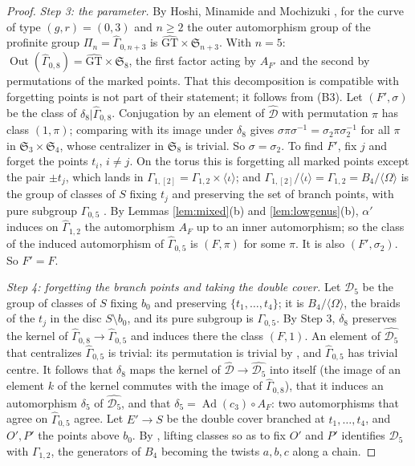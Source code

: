 \documentclass[11pt,a4paper]{article}
\theoremstyle{plain}
\theoremstyle{definition}
\theoremstyle{remark}
\newcommand{\GT}{\widehat{\mathrm{GT}}}
\newcommand{\Gh}{\widehat\Gamma}
\newcommand{\Ad}{\operatorname{Ad}}
\newcommand{\Out}{\operatorname{Out}}
\begin{document}
\begin{proof}
\emph{Step 3: the parameter.} By Hoshi, Minamide and Mochizuki
\cite[Corollary C; Corollary 2.8 in the body]{HMM}, for the curve of type $(g,r)=(0,3)$ and $n\ge2$ the outer
automorphism group of the profinite group $\Pi_n=\Gh_{0,n+3}$ is $\GT\times\mathfrak S_{n+3}$. With $n=5$:
$\Out(\Gh_{0,8})=\GT\times\mathfrak S_8$, the first factor acting by $A_{F'}$ and the second by permutations of the
marked points. That this decomposition is compatible with forgetting points is not part of their statement; it
follows from (B3). Let $(F',\sigma)$ be the class of
$\delta_8|\Gh_{0,8}$. Conjugation by an element of $\widehat{\mathcal D}$ with permutation $\pi$ has class $(1,\pi)$;
comparing with its image under $\delta_8$ gives $\sigma\pi\sigma^{-1}=\sigma_2\pi\sigma_2^{-1}$ for all $\pi$ in
$\mathfrak S_3\times\mathfrak S_4$, whose centralizer in $\mathfrak S_8$ is trivial. So $\sigma=\sigma_2$. To find
$F'$, fix $j$ and forget the points $t_i$, $i\ne j$. On the torus this is forgetting all marked points except the
pair $\pm t_j$, which lands in $\Gamma_{1,[2]}=\Gamma_{1,2}\times\langle\iota\rangle$; and
$\Gamma_{1,[2]}/\langle\iota\rangle=\Gamma_{1,2}=B_4/\langle\Omega\rangle$ is the group of classes of $S$ fixing
$t_j$ and preserving the set of branch points, with pure subgroup $\Gamma_{0,5}$ \cite{BH}. By Lemmas
\ref{lem:mixed}(b) and \ref{lem:lowgenus}(b), $\alpha'$ induces on $\Gh_{1,2}$ the automorphism $A_F$ up to an
inner automorphism; so the class of the induced automorphism of $\Gh_{0,5}$ is $(F,\pi)$ for some $\pi$. It is also
$(F',\sigma_2)$. So $F'=F$.

\emph{Step 4: forgetting the branch points and taking the double cover.} Let $\mathcal D_5$ be the group of
classes of $S$ fixing $b_0$ and preserving $\{t_1,\dots,t_4\}$; it is $B_4/\langle\Omega\rangle$, the braids of
the $t_j$ in the disc $S\setminus b_0$, and its pure subgroup is $\Gamma_{0,5}$. By Step 3, $\delta_8$ preserves the
kernel of $\Gh_{0,8}\to\Gh_{0,5}$ and induces there the class $(F,1)$. An element of $\widehat{\mathcal D_5}$
that centralizes $\Gh_{0,5}$ is trivial: its permutation is trivial by \cite{HMM}, and $\Gh_{0,5}$ has trivial
centre. It follows that $\delta_8$ maps the kernel of $\widehat{\mathcal D}\to\widehat{\mathcal D_5}$ into itself
(the image of an element $k$ of the kernel commutes with the image of $\Gh_{0,8}$), that it induces an automorphism
$\delta_5$ of $\widehat{\mathcal D_5}$, and that $\delta_5=\Ad(c_3)\circ A_F$: two automorphisms that agree on
$\Gh_{0,5}$ agree. Let $E'\to S$ be the double cover branched at $t_1,\dots,t_4$, and $O',P'$ the points above
$b_0$. By \cite{BH}, lifting classes so as to fix $O'$ and $P'$ identifies $\mathcal D_5$ with
$\Gamma_{1,2}$, the generators of $B_4$ becoming the twists $a,b,c$ along a chain.


\end{proof}
\end{document}
